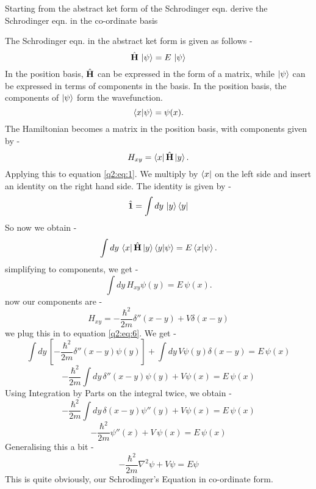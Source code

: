 Starting from the abstract ket form of the Schrodinger eqn. derive the Schrodinger eqn. in the co-ordinate basis

The Schrodinger eqn. in the abstract ket form is given as follows -
    \begin{equation} \label{q2:eq:1}
        \hat{\textbf{H}} \, \ket{\psi} = E\, \ket{\psi}
    \end{equation}
In the position basis, $\hat{\textbf{H}}$ can be expressed in the form of a matrix, while $\ket{\psi}$ can be expressed in terms of components in the basis.
In the position basis, the components of $\ket{\psi}$ form the wavefunction.
    \begin{equation}
        \braket{x}{\psi} = \psi(x).
    \end{equation}
The Hamiltonian becomes a matrix in the position basis, with components given by -
    \begin{equation}
        H_{xy} = \bra{x}\hat{\textbf{H}}\ket{y}.
    \end{equation}
Applying this to equation \ref{q2:eq:1}. We multiply by $\bra{x}$ on the left side and insert an identity on the right hand side.
The identity is given by - 
    \begin{equation}
        \hat{\textbf{1}} = \int dy\, \ket{y}\bra{y}
    \end{equation}
So now we obtain - 
    \begin{equation}
        \int dy\, \bra{x}\hat{\textbf{H}}\ket{y}\braket{y}{\psi} = E \braket{x}{\psi}.
    \end{equation}
simplifying to components, we get -
    \begin{equation} \label{q2:eq:6}
        \int dy \, H_{xy} \psi(y) = E \, \psi(x).
    \end{equation}
now our components are - 
    \begin{equation}
        H_{xy} = -\frac{\hbar^2}{2m}\delta''(x-y) + V\delta(x-y)
    \end{equation}
we plug this in to equation \ref{q2:eq:6}. We get - 
    \begin{equation}
        \int dy \, [-\frac{\hbar^2}{2m}\delta''(x-y) \psi(y)] + \int dy \, V\psi(y)\delta(x-y) = E \, \psi(x)
    \end{equation}
    \begin{equation}
        - \frac{\hbar^2}{2m} \int dy \, \delta''(x-y) \psi(y) + V \psi(x) = E\,  \psi(x)        
    \end{equation}
Using Integration by Parts on the integral twice, we obtain - 
    \begin{equation}
        - \frac{\hbar^2}{2m} \int dy \, \delta(x-y) \psi''(y) + V \psi(x) = E\,  \psi(x)        
    \end{equation}
    \begin{equation}
        - \frac{\hbar^2}{2m} \psi''(x) + V\, \psi(x) = E\,  \psi(x)        
    \end{equation}
Generalising this a bit - 
    \begin{equation}
        - \frac{\hbar^2}{2m} \nabla^2 \psi + V \psi = E \psi        
    \end{equation}
This is quite obviously, our Schrodinger's Equation in co-ordinate form.
